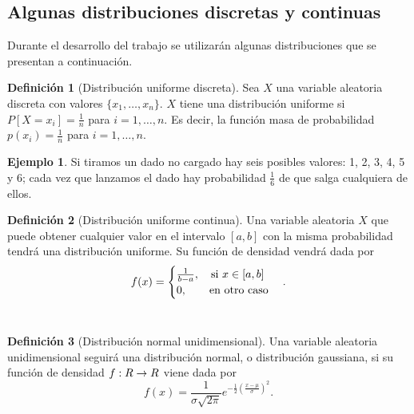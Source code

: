 \documentclass[12pt,a4paper]{report} %
\theoremstyle{definition}
\newtheorem{definition}{Definición}[section]
\newtheorem{example}[theorem]{Ejemplo}
\begin{document}
\subsection{Algunas distribuciones discretas y continuas}

Durante el desarrollo del trabajo se utilizarán algunas distribuciones que se presentan a continuación.\\
\begin{definition}[Distribución uniforme discreta]
Sea $X$ una variable aleatoria discreta con valores $\{x_1,\dots,x_n\}$. $X$ tiene una distribución uniforme si $P[X = x_i] = \frac{1}{n}$ para $i=1,\dots,n$. Es decir, la función masa de probabilidad $p(x_i) = \frac{1}{n}$ para $i=1,\dots,n$.\\
\end{definition}

\begin{example}
  Si tiramos un dado no cargado hay seis posibles valores: 1, 2, 3, 4, 5 y 6; cada vez que lanzamos el dado hay probabilidad $\frac{1}{6}$ de que salga cualquiera de ellos.\\
\end{example}

\begin{definition}[Distribución uniforme continua]
  Una variable aleatoria $X$ que puede obtener cualquier valor en el intervalo $[a,b]$ con la misma probabilidad tendrá una distribución uniforme. Su función de densidad vendrá dada por \[
f(x) = 
\begin{cases}
  \frac{1}{b-a},\quad \text{si } x\in [a,b]\\
  0,\quad\quad \text{en otro caso}
\end{cases}.\\
  \]\\[-10pt]
\end{definition}

\begin{definition}[Distribución normal unidimensional]
  Una variable aleatoria unidimensional seguirá una distribución normal, o distribución gaussiana, si su función de densidad $f:\relax{R}\to\relax{R}$ viene dada por \[
f(x) = \frac{1}{\sigma\sqrt{2\pi}}e^{-\frac{1}{2}\left( \frac{x-\mu}{\sigma}\right ) ^2}.
\]\\[-10pt]
\end{definition}
\end{document}
